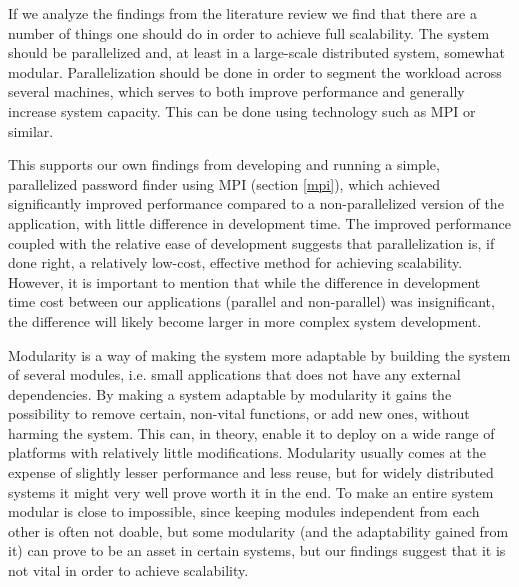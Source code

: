 \documentclass{article}
\begin{document}
{If we analyze the findings from the literature review we find that there are a
number of things one should do in order to achieve full scalability.  The
system should be parallelized and, at least in a large-scale distributed
system, somewhat modular. Parallelization should be done in order to segment
the workload across several machines, which serves to both improve performance
and generally increase system
capacity\cite{fayad2005towards}\cite{haggander1999guidelines}\cite{caruso1997toward}.
This can be done using technology such as
MPI\cite{gropp1996high}\cite{miller2002pympi}\cite{millerparallel} or similar.

This supports our own findings from developing and running a simple,
parallelized password finder using MPI (section \ref{mpi}), which achieved
significantly improved performance compared to a non-parallelized version of
the application, with little difference in development time. The improved
performance coupled with the relative ease of development suggests that
parallelization is, if done right, a relatively low-cost, effective method for
achieving scalability. However, it is important to mention that while the
difference in development time cost between our applications (parallel and
non-parallel) was insignificant, the difference will likely become larger in
more complex system development.

Modularity is a way of making the system more adaptable by building the system
of several modules, i.e. small applications that does not have any external
dependencies\cite{lipson2007principles}. By making a system adaptable by
modularity it gains the possibility to remove certain, non-vital functions, or
add new ones, without harming the system. This can, in theory, enable it to
deploy on a wide range of platforms with relatively little modifications.
Modularity usually comes at the expense of slightly lesser performance and less
reuse, but for widely distributed systems it might very well prove worth it in
the end. To make an entire system modular is close to impossible, since keeping
modules independent from each other is often not doable, but some modularity
(and the adaptability gained from it) can prove to be an asset in certain
systems, but our findings suggest that it is not vital in order to achieve
scalability.

}
\end{document}
